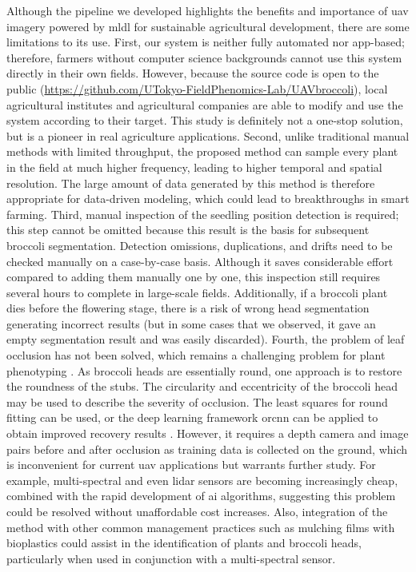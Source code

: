 Although the pipeline we developed highlights the benefits and importance of \gls{uav} imagery powered by \gls{mldl} for sustainable agricultural development, there are some limitations to its use. 
First, our system is neither fully automated nor app-based; therefore, farmers without computer science backgrounds cannot use this system directly in their own fields. However, because the source code is open to the public (\url{https://github.com/UTokyo-FieldPhenomics-Lab/UAVbroccoli}), local agricultural institutes and agricultural companies are able to modify and use the system according to their target. This study is definitely not a one-stop solution, but is a pioneer in real agriculture applications. 
Second, unlike traditional manual methods with limited throughput, the proposed method can sample every plant in the field at much higher frequency, leading to higher temporal and spatial resolution. The large amount of data generated by this method is therefore appropriate for data-driven modeling, which could lead to breakthroughs in smart farming.
Third, manual inspection of the seedling position detection is required; this step cannot be omitted because this result is the basis for subsequent broccoli segmentation. Detection omissions, duplications, and drifts need to be checked manually on a case-by-case basis. Although it saves considerable effort compared to adding them manually one by one, this inspection still requires several hours to complete in large-scale fields. Additionally, if a broccoli plant dies before the flowering stage, there is a risk of wrong head segmentation generating incorrect results (but in some cases that we observed, it gave an empty segmentation result and was easily discarded). 
Fourth, the problem of leaf occlusion has not been solved, which remains a challenging problem for plant phenotyping \citep{zhang_applications_2020}. As broccoli heads are essentially round, one approach is to restore the roundness of the stubs. The circularity and eccentricity of the broccoli head may be used to describe the severity of occlusion. The least squares for round fitting can be used, or the deep learning framework \gls{orcnn} can be applied to obtain improved recovery results \citep{blok_image_2021}. However, it requires a depth camera and image pairs before and after occlusion as training data is collected on the ground, which is inconvenient for current \gls{uav} applications but warrants further study. For example, multi-spectral and even \gls{lidar} sensors are becoming increasingly cheap, combined with the rapid development of \gls{ai} algorithms, suggesting this problem could be resolved without unaffordable cost increases. Also, integration of the method with other common management practices such as mulching films with bioplastics could assist in the identification of plants and broccoli heads, particularly when used in conjunction with a multi-spectral sensor. 
